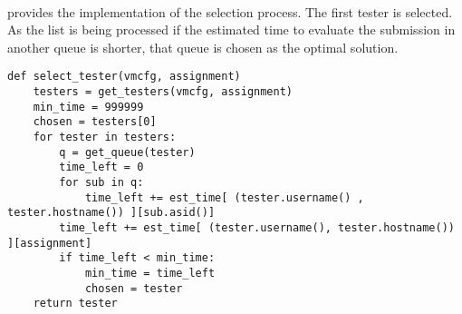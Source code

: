 \paragraph {}
\paragraph {}
\paragraph {}

 provides the implementation of the 
selection process. The first tester is selected. As the list is being processed
if the estimated time to evaluate the submission in another queue is shorter,
that queue is chosen as the optimal solution.

\lstset{caption=Selecting the best tester, language=python, label=lst:tester-select}
\begin{lstlisting}
def select_tester(vmcfg, assignment)
    testers = get_testers(vmcfg, assignment)
    min_time = 999999
    chosen = testers[0]
    for tester in testers:
        q = get_queue(tester)
        time_left = 0
        for sub in q:
            time_left += est_time[ (tester.username() , tester.hostname()) ][sub.asid()]
        time_left += est_time[ (tester.username(), tester.hostname()) ][assignment]
        if time_left < min_time:
            min_time = time_left
            chosen = tester
    return tester
\end{lstlisting}    
